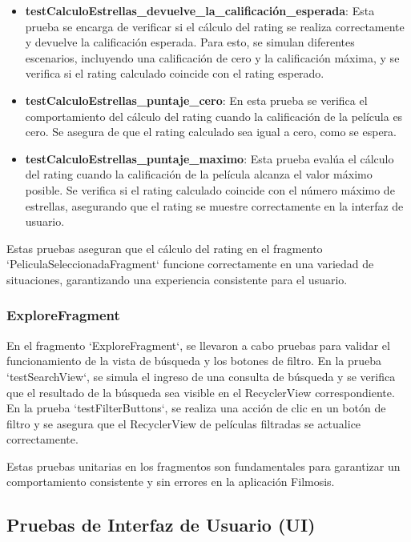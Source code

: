 \documentclass{article}
\begin{document}
\begin{itemize}
    \item \textbf{testCalculoEstrellas\_devuelve\_la\_calificación\_esperada}: Esta prueba se encarga de verificar si el cálculo del rating se realiza correctamente y devuelve la calificación esperada. Para esto, se simulan diferentes escenarios, incluyendo una calificación de cero y la calificación máxima, y se verifica si el rating calculado coincide con el rating esperado.
    
    \item \textbf{testCalculoEstrellas\_puntaje\_cero}: En esta prueba se verifica el comportamiento del cálculo del rating cuando la calificación de la película es cero. Se asegura de que el rating calculado sea igual a cero, como se espera.
    
    \item \textbf{testCalculoEstrellas\_puntaje\_maximo}: Esta prueba evalúa el cálculo del rating cuando la calificación de la película alcanza el valor máximo posible. Se verifica si el rating calculado coincide con el número máximo de estrellas, asegurando que el rating se muestre correctamente en la interfaz de usuario.
\end{itemize}

Estas pruebas aseguran que el cálculo del rating en el fragmento `PeliculaSeleccionadaFragment` funcione correctamente en una variedad de situaciones, garantizando una experiencia consistente para el usuario.

\subsubsection{ExploreFragment}

En el fragmento `ExploreFragment`, se llevaron a cabo pruebas para validar el funcionamiento de la vista de búsqueda y los botones de filtro. En la prueba `testSearchView`, se simula el ingreso de una consulta de búsqueda y se verifica que el resultado de la búsqueda sea visible en el RecyclerView correspondiente. En la prueba `testFilterButtons`, se realiza una acción de clic en un botón de filtro y se asegura que el RecyclerView de películas filtradas se actualice correctamente.

Estas pruebas unitarias en los fragmentos son fundamentales para garantizar un comportamiento consistente y sin errores en la aplicación Filmosis.

\subsection{Pruebas de Interfaz de Usuario (UI)}
\end{document}
